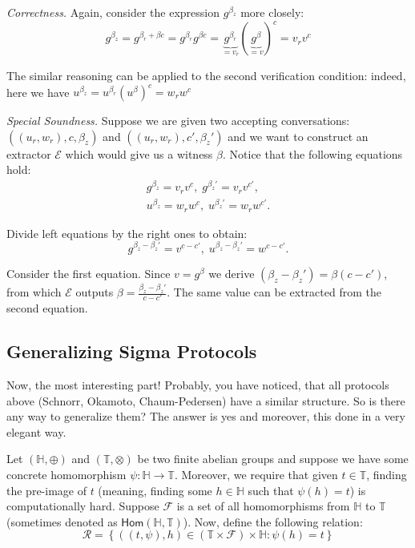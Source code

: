 \documentclass[../../book.tex]{subfiles}
\begin{document}
\textit{Correctness.} Again, consider the expression $g^{\beta_z}$ more closely:
\begin{equation*}
    g^{\beta_z} = g^{\beta_r + \beta c} = g^{\beta_r}g^{\beta c} = \underbrace{g^{\beta_r}}_{=v_r}(\underbrace{g^{\beta}}_{=v})^c = v_rv^c
\end{equation*}

The similar reasoning can be applied to the second verification condition: indeed, here we have $u^{\beta_z} = u^{\beta_r}(u^{\beta})^c = w_rw^c$

\textit{Special Soundness.} Suppose we are given two accepting conversations: $((u_r,w_r),c,\beta_z)$ and $((u_r,w_r),c',\beta_z')$ and we want to construct an extractor $\mathcal{E}$ which would give us a witness $\beta$. Notice that the following equations hold:
\begin{align*}
    g^{\beta_z} = v_rv^c, \; g^{\beta_z'} = v_rv^{c'}, \\ u^{\beta_z} = w_rw^c, \; u^{\beta_z'} = w_rw^{c'}.
\end{align*}

Divide left equations by the right ones to obtain:
\begin{equation*}
    g^{\beta_z - \beta_z'} = v^{c-c'}, \; u^{\beta_z - \beta_z'} = w^{c-c'}.
\end{equation*}

Consider the first equation. Since $v=g^{\beta}$ we derive $(\beta_z-\beta_z') = \beta(c-c')$, from which $\mathcal{E}$ outputs $\beta = \frac{\beta_z-\beta_z'}{c-c'}$. The same value can be extracted from the second equation.

\subsection{Generalizing Sigma Protocols}

Now, the most interesting part! Probably, you have noticed, that all protocols above (Schnorr, Okamoto, Chaum-Pedersen) have a similar structure. So is there any way to generalize them? The answer is yes and moreover, this done in a very elegant way.

Let $(\mathbb{H}, \oplus)$ and $(\mathbb{T}, \otimes)$ be two finite abelian groups and suppose we have some concrete homomorphism $\psi: \mathbb{H} \to \mathbb{T}$. Moreover, we require that given $t \in \mathbb{T}$, finding the pre-image of $t$ (meaning, finding some $h \in \mathbb{H}$ such that $\psi(h)=t$) is computationally hard. Suppose $\mathcal{F}$ is a set of all homomorphisms from $\mathbb{H}$ to $\mathbb{T}$ (sometimes denoted as $\mathsf{Hom}(\mathbb{H}, \mathbb{T})$). Now, define the following relation:
\begin{equation*}
    \mathcal{R} = \left\{ ((t,\psi), h) \in (\mathbb{T} \times \mathcal{F}) \times \mathbb{H}: \psi(h) = t \right\}
\end{equation*}
\end{document}
